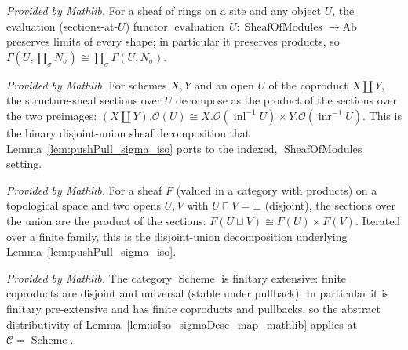 \begin{lemma}
  \label{lem:evaluation_preserves_products_mathlib}
  \mathlibok
  \textit{Provided by Mathlib.}
  For a sheaf of rings on a site and any object \(U\), the evaluation (sections-at-\(U\))
  functor \(\operatorname{evaluation}\,U : \operatorname{SheafOfModules} \to \mathrm{Ab}\)
  preserves limits of every shape; in particular it preserves products, so \(\Gamma(U,
  \prod_\sigma N_\sigma) \cong \prod_\sigma \Gamma(U, N_\sigma)\).
\end{lemma}

\begin{lemma}
  \label{lem:coprodPresheafObjIso_mathlib}
  \mathlibok
  \textit{Provided by Mathlib.}
  For schemes \(X, Y\) and an open \(U\) of the coproduct \(X \amalg Y\), the structure-sheaf
  sections over \(U\) decompose as the product of the sections over the two preimages:
  \((X \amalg Y).\mathcal{O}(U) \cong X.\mathcal{O}(\operatorname{inl}^{-1} U) \times
  Y.\mathcal{O}(\operatorname{inr}^{-1} U)\). This is the binary disjoint-union sheaf
  decomposition that Lemma~\ref{lem:pushPull_sigma_iso} ports to the indexed,
  \(\operatorname{SheafOfModules}\) setting.
\end{lemma}

\begin{lemma}
  \label{lem:isProductOfDisjoint_mathlib}
  \mathlibok
  \textit{Provided by Mathlib.}
  For a sheaf \(F\) (valued in a category with products) on a topological space and two opens
  \(U, V\) with \(U \sqcap V = \bot\) (disjoint), the sections over the union are the product
  of the sections: \(F(U \sqcup V) \cong F(U) \times F(V)\). Iterated over a finite family,
  this is the disjoint-union decomposition underlying Lemma~\ref{lem:pushPull_sigma_iso}.
\end{lemma}


\begin{lemma}
  \label{lem:finitaryExtensive_scheme_mathlib}
  \mathlibok
  \textit{Provided by Mathlib.}
  The category \(\operatorname{Scheme}\) is finitary extensive: finite coproducts are disjoint
  and universal (stable under pullback). In particular it is finitary pre-extensive and has
  finite coproducts and pullbacks, so the abstract distributivity of
  Lemma~\ref{lem:isIso_sigmaDesc_map_mathlib} applies at \(\mathcal{C} = \operatorname{Scheme}\).
\end{lemma}

